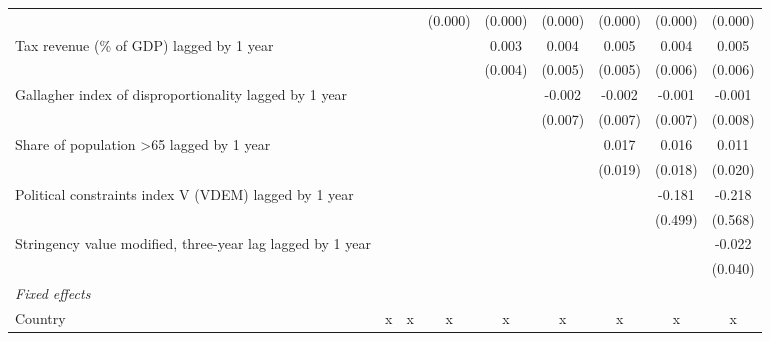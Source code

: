\begin{tabular}{lcccccccc}
                                                              &             &             & (0.000)     & (0.000)     & (0.000)       & (0.000)       & (0.000)       & (0.000)\\   
   Tax revenue (\% of GDP) lagged by 1 year                   &             &             &             & 0.003       & 0.004         & 0.005         & 0.004         & 0.005\\   
                                                              &             &             &             & (0.004)     & (0.005)       & (0.005)       & (0.006)       & (0.006)\\   
   Gallagher index of disproportionality lagged by 1 year     &             &             &             &             & -0.002        & -0.002        & -0.001        & -0.001\\   
                                                              &             &             &             &             & (0.007)       & (0.007)       & (0.007)       & (0.008)\\   
   Share of population >65 lagged by 1 year                   &             &             &             &             &               & 0.017         & 0.016         & 0.011\\   
                                                              &             &             &             &             &               & (0.019)       & (0.018)       & (0.020)\\   
   Political constraints index V (VDEM) lagged by 1 year      &             &             &             &             &               &               & -0.181        & -0.218\\   
                                                              &             &             &             &             &               &               & (0.499)       & (0.568)\\   
   Stringency value modified, three-year lag lagged by 1 year &             &             &             &             &               &               &               & -0.022\\   
                                                              &             &             &             &             &               &               &               & (0.040)\\   
   \emph{Fixed effects}\\
   Country                                                    & x           & x           & x           & x           & x             & x             & x             & x\\  

\end{tabular}
